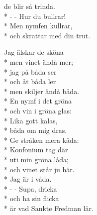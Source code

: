 \begin{SongText}
\begin{SongVerse}
        de blir så trinda.\\*%
        - - Hur du bullrar!\\*%
        Men nymfen kullrar,\\*%
        och skrattar med din trut. 
    \end{SongVerse}
    \begin{SongVerse}
        Jag älskar de sköna\\*%
        men vinet ändå mer;\\*%
        jag på båda ser\\*%
        och åt båda ler\\*%
        men skiljer ändå båda.\\*%
        En nymf i det gröna\\*%
        och vin i gröna glas:\\*%
        Lika gott kalas,\\*%
        båda om mig dras.\\*%
        Ge stråken mera kåda:\\*%
        Konfonium tag där\\*%
        uti min gröna låda;\\*%
        och vinet står ju här.\\*%
        Jag är i våda.\\*%
        - - Supa, dricka\\*%
        och ha sin flicka\\*%
        är vad Sankte Fredman lär. 
    \end{SongVerse}
\end{SongText}